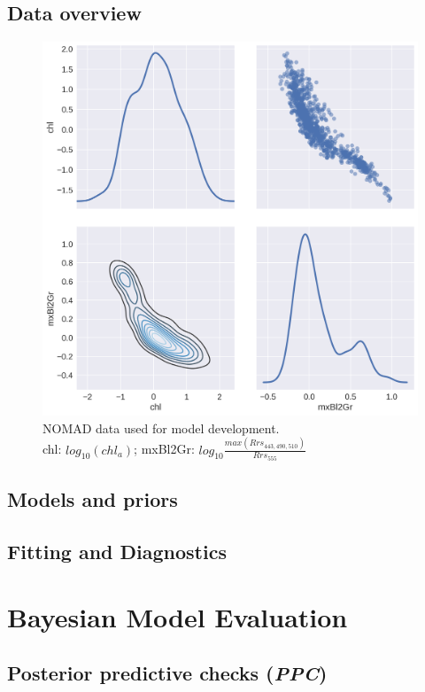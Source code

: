 \documentclass[10pt]{article}
\begin{document}
	\subsection{Data overview}
		\begin{figure}[H]
				\centering
				\includegraphics[scale=0.4]{dataOverview.png}
				\caption{NOMAD data used for model development.\\chl: $log_{10}(chl_{\textit{a}})$;
						 mxBl2Gr: $log_{10}\frac{max(Rrs_{443, 490, 510})}{Rrs_{555}}$}
			\end{figure}%
	\subsection{Models and priors}
	\subsection{Fitting and Diagnostics}
	
\newpage
\section{Bayesian Model Evaluation}
	\subsection{Posterior predictive checks (\textit{PPC})}
\end{document}
